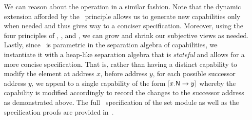 We can reason about the  operation in a similar fashion. Note that the dynamic extension afforded by the \extendRule\ principle allows us to generate new capabilities only when needed and thus gives way to a conciser specification. Moreover, using the four principles of \mergeRule, \forgetRule, \shiftRule and \copyRule, we can grow and shrink our subjective views as needed. Lastly, since \colosl\ is parametric in the separation algebra of capabilities, we instantiate it with a heap-like separation algebra that is \emph{stateful} and allows for a more concise specification. That is, rather than having a distinct capability to modify the element at address $x$, before address $y$, for each possible successor address $y$, we appeal to a single capability of the form $\nextC{x}{y}$ whereby the capability is modified accordingly to record the changes to the successor address as demonstrated above. The full \colosl\ specification of the set module as well as the specification proofs are provided in~\cite{colosl-tr14}.


